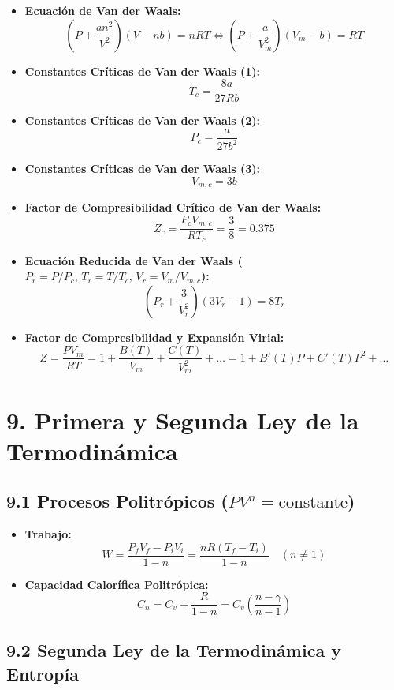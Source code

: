 \documentclass[11pt,a4paper]{article}
\begin{document}
\begin{itemize}
  \item \textbf{Ecuación de Van der Waals:}
  \[
    \left( P + \frac{a n^2}{V^2} \right)(V - n b) = n R T \iff \left( P + \frac{a}{V_m^2} \right)(V_m - b) = R T
  \]
  \item \textbf{Constantes Críticas de Van der Waals (1):}
  \[
    T_c = \frac{8a}{27Rb}
  \]
  \item \textbf{Constantes Críticas de Van der Waals (2):}
  \[
    P_c = \frac{a}{27b^2}
  \]
  \item \textbf{Constantes Críticas de Van der Waals (3):}
  \[
    V_{m,c} = 3b
  \]
  \item \textbf{Factor de Compresibilidad Crítico de Van der Waals:}
  \[
    Z_c = \frac{P_c V_{m,c}}{R T_c} = \frac{3}{8} = 0.375
  \]
  \item \textbf{Ecuación Reducida de Van der Waals ($P_r = P/P_c, \, T_r = T/T_c, \, V_r = V_m/V_{m,c}$):}
  \[
    \left( P_r + \frac{3}{V_r^2} \right)(3V_r - 1) = 8T_r
  \]
  \item \textbf{Factor de Compresibilidad y Expansión Virial:}
  \[
    Z = \frac{P V_m}{R T} = 1 + \frac{B(T)}{V_m} + \frac{C(T)}{V_m^2} + \dots = 1 + B'(T)P + C'(T)P^2 + \dots
  \]
\end{itemize}

\section*{9. Primera y Segunda Ley de la Termodinámica}

\subsection*{9.1 Procesos Politrópicos ($P V^n = \text{constante}$)}

\begin{itemize}
  \item \textbf{Trabajo:}
  \[
    W = \frac{P_f V_f - P_i V_i}{1 - n} = \frac{n R (T_f - T_i)}{1 - n} \quad (n \neq 1)
  \]
  \item \textbf{Capacidad Calorífica Politrópica:}
  \[
    C_n = C_v + \frac{R}{1 - n} = C_v \left( \frac{n - \gamma}{n - 1} \right)
  \]
\end{itemize}

\subsection*{9.2 Segunda Ley de la Termodinámica y Entropía}
\end{document}
